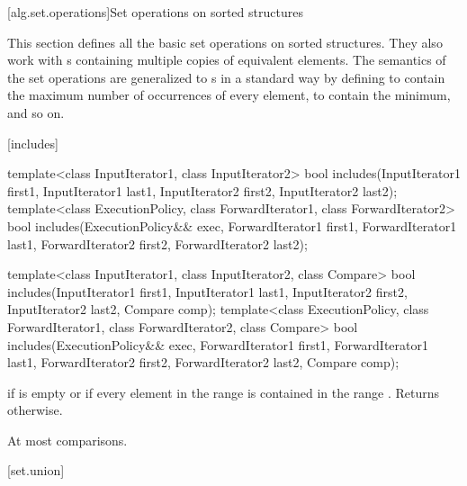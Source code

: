 [alg.set.operations]{Set operations on sorted structures}

\pnum
This section defines all the basic set operations on sorted structures.
They also work with
s
containing multiple copies of equivalent elements.
The semantics of the set operations are generalized to
s
in a standard way by defining
to contain the maximum number of occurrences of every element,
to contain the minimum, and so on.

[includes]{}

%
\begin{itemdecl}
template<class InputIterator1, class InputIterator2>
  bool includes(InputIterator1 first1, InputIterator1 last1,
                InputIterator2 first2, InputIterator2 last2);
template<class ExecutionPolicy, class ForwardIterator1, class ForwardIterator2>
  bool includes(ExecutionPolicy&& exec,
                ForwardIterator1 first1, ForwardIterator1 last1,
                ForwardIterator2 first2, ForwardIterator2 last2);

template<class InputIterator1, class InputIterator2, class Compare>
  bool includes(InputIterator1 first1, InputIterator1 last1,
                InputIterator2 first2, InputIterator2 last2,
                Compare comp);
template<class ExecutionPolicy, class ForwardIterator1, class ForwardIterator2, class Compare>
  bool includes(ExecutionPolicy&& exec,
                ForwardIterator1 first1, ForwardIterator1 last1,
                ForwardIterator2 first2, ForwardIterator2 last2,
                Compare comp);
\end{itemdecl}

\begin{itemdescr}
\pnum
\returns
{}
if  is empty or
if every element in the range
is contained in the range
.
Returns
otherwise.

\pnum
\complexity
At most
comparisons.
\end{itemdescr}

[set.union]{}

